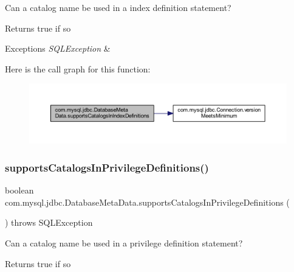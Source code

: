 Can a catalog name be used in a index definition statement?

\begin{DoxyReturn}{Returns}
true if so 
\end{DoxyReturn}

\begin{DoxyExceptions}{Exceptions}
{\em S\+Q\+L\+Exception} & \\
\hline
\end{DoxyExceptions}
Here is the call graph for this function\+:
\nopagebreak
\begin{figure}[H]
\begin{center}
\leavevmode
\includegraphics[width=350pt]{classcom_1_1mysql_1_1jdbc_1_1_database_meta_data_a2a6676d40a055f69965fae7c3767cc9d_cgraph}
\end{center}
\end{figure}
\mbox{\label{classcom_1_1mysql_1_1jdbc_1_1_database_meta_data_abf583ff76a0cebb69d2483dc2227abe0}} 
\subsubsection{\texorpdfstring{supports\+Catalogs\+In\+Privilege\+Definitions()}{supportsCatalogsInPrivilegeDefinitions()}}
{\footnotesize\ttfamily boolean com.\+mysql.\+jdbc.\+Database\+Meta\+Data.\+supports\+Catalogs\+In\+Privilege\+Definitions (\begin{DoxyParamCaption}{ }\end{DoxyParamCaption}) throws S\+Q\+L\+Exception}

Can a catalog name be used in a privilege definition statement?

\begin{DoxyReturn}{Returns}
true if so 
\end{DoxyReturn}


